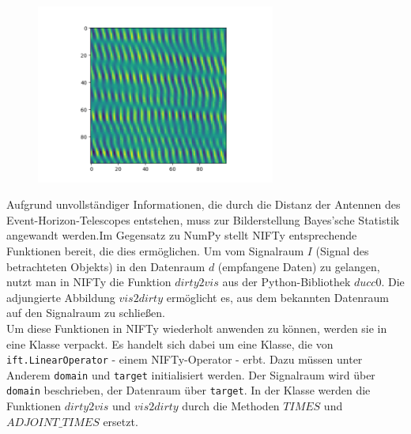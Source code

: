 \documentclass[]{dsadokumentation}
\begin{document}
\begin{figure}
  \centering
  \includegraphics[width=0.7\textwidth]{k4.2/unkalibrierte-daten.png}
\end{figure}

Aufgrund unvollständiger Informationen, die durch die Distanz der Antennen des Event-Horizon-Telescopes entstehen, muss zur Bilderstellung Bayes'sche Statistik angewandt werden.Im Gegensatz zu NumPy stellt NIFTy entsprechende Funktionen bereit, die dies ermöglichen. Um vom Signalraum $I$ (Signal des betrachteten Objekts) in den Datenraum $d$ (empfangene Daten) zu gelangen, nutzt man in NIFTy die Funktion $dirty2vis$ aus der Python-Bibliothek $ducc0$. Die adjungierte Abbildung $vis2dirty$ ermöglicht es, aus dem bekannten Datenraum auf den Signalraum zu schließen.\\
Um diese Funktionen in NIFTy wiederholt anwenden zu können, werden sie in eine Klasse verpackt. Es handelt sich dabei um eine Klasse, die von \verb|ift.LinearOperator| - einem NIFTy-Operator - erbt. Dazu müssen unter Anderem \verb|domain| und \verb|target| initialisiert werden. Der Signalraum wird über \verb|domain| beschrieben, der Datenraum über \verb|target|. In der Klasse werden die Funktionen $dirty2vis$ und $vis2dirty$ durch die Methoden $TIMES$ und $ADJOINT \_ TIMES$ ersetzt.
\end{document}
